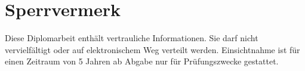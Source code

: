 \chapter*{Sperrvermerk}

Diese Diplomarbeit enthält vertrauliche Informationen. Sie darf nicht vervielfältigt oder auf elektronischem Weg verteilt werden. Einsichtnahme ist für einen Zeitraum von 5 Jahren ab Abgabe nur für Prüfungszwecke gestattet.


